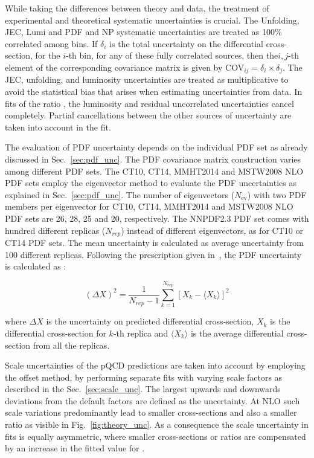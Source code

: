 While taking the differences between theory and data, the treatment of experimental and theoretical systematic uncertainties is crucial. The Unfolding, JEC, Lumi and PDF and NP systematic uncertainties are treated as 100$\%$ correlated among \httwo bins. If $\delta_i$ is the total uncertainty on the differential cross-section, for the $i$-th \httwo bin, for any of these fully correlated sources, then the$i,j$-th element of the corresponding covariance matrix is given by COV$_{ij} = \delta_i \times \delta_j$. The JEC, unfolding, and luminosity uncertainties are treated as multiplicative to avoid the statistical bias that arises when estimating uncertainties from data. In fits of the ratio \ratio, the luminosity and residual uncorrelated uncertainties cancel completely. Partial cancellations between the other sources of uncertainty are taken into account in the fit. 

The evaluation of PDF uncertainty depends on the individual PDF set as already discussed in Sec.~\ref{sec:pdf_unc}. The PDF covariance matrix construction varies among different PDF sets. The CT10, CT14, MMHT2014 and MSTW2008 NLO PDF sets employ the eigenvector method to evaluate the PDF uncertainties as explained in Sec.~\ref{sec:pdf_unc}. The number of eigenvectors ($N_\mathrm{ev}$) with two PDF members per eigenvector for CT10, CT14, MMHT2014 and MSTW2008 NLO PDF sets are 26, 28, 25 and 20, respectively. The NNPDF2.3 PDF set comes with hundred different replicas ($N_{rep}$) instead of different eigenvectors, as for CT10 or CT14 PDF sets. The mean uncertainty is calculated as average uncertainty from 100 different replicas. Following the prescription given in~\cite{Ball:2010de}, the PDF uncertainty is calculated as :

\begin{equation}
(\Delta X)^2 = \frac{1}{N_{rep}-1} \sum_{k=1}^{N_{rep}} [X_k - \langle X_k \rangle]^2
\end{equation}

where $\Delta X$ is the uncertainty on predicted differential cross-section, $X_k$ is the differential cross-section for $k$-th replica and $\langle X_k \rangle$ is the average differential cross-section from all the replicas. 

Scale uncertainties of the pQCD predictions are taken into account by employing the offset method, \ie by performing separate fits with varying scale factors as described in the Sec.~\ref{sec:scale_unc}. The largest upwards and downwards deviations from the default factors are defined as the uncertainty. At NLO such scale variations predominantly lead to smaller cross-sections and also a smaller ratio \ratio as visible in Fig.~\ref{fig:theory_unc}. As a consequence the scale uncertainty in fits is equally asymmetric, where smaller cross-sections or ratios are compensated by an increase in the fitted value for \alpsmz.


